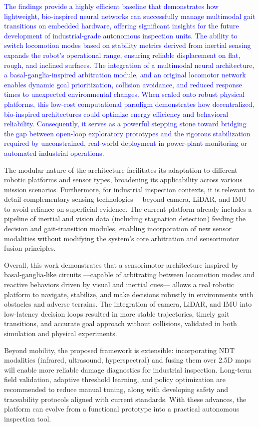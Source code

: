 \documentclass[preprint,12pt]{elsarticle}
\newcommand{\revblue}[1]{\textcolor{blue}{#1}}
\begin{document}
\revblue{The findings provide a highly efficient baseline that demonstrates how lightweight, bio-inspired neural networks can successfully manage multimodal gait transitions on embedded hardware, offering significant insights for the future development of industrial-grade autonomous inspection units. The ability to switch locomotion modes based on stability metrics derived from inertial sensing expands the robot's operational range, ensuring reliable displacement on flat, rough, and inclined surfaces. The integration of a multimodal neural architecture, a basal-ganglia-inspired arbitration module, and an original locomotor network enables dynamic goal prioritization, collision avoidance, and reduced response times to unexpected environmental changes. When scaled onto robust physical platforms, this low-cost computational paradigm demonstrates how decentralized, bio-inspired architectures could optimize energy efficiency and behavioral reliability. Consequently, it serves as a powerful stepping stone toward bridging the gap between open-loop exploratory prototypes and the rigorous stabilization required by unconstrained, real-world deployment in power-plant monitoring or automated industrial operations.} 

The modular nature of the architecture facilitates its adaptation to different robotic platforms and sensor types, broadening its applicability across various mission scenarios. Furthermore, for industrial inspection contexts, it is relevant to detail complementary sensing technologies ---beyond camera, LiDAR, and IMU--- to avoid reliance on superficial evidence. The current platform already includes a pipeline of inertial and vision data (including stagnation detection) feeding the decision and gait-transition modules, enabling incorporation of new sensor modalities without modifying the system’s core arbitration and sensorimotor fusion principles. 

Overall, this work demonstrates that a sensorimotor architecture inspired by basal-ganglia-like circuits ---capable of arbitrating between locomotion modes and reactive behaviors driven by visual and inertial cues--- allows a real robotic platform to navigate, stabilize, and make decisions robustly in environments with obstacles and adverse terrains. The integration of camera, LiDAR, and IMU into low-latency decision loops resulted in more stable trajectories, timely gait transitions, and accurate goal approach without collisions, validated in both simulation and physical experiments. 

Beyond mobility, the proposed framework is extensible: incorporating NDT modalities (infrared, ultrasound, hyperspectral) and fusing them over 2.5D maps will enable more reliable damage diagnostics for industrial inspection. Long-term field validation, adaptive threshold learning, and policy optimization are recommended to reduce manual tuning, along with developing safety and traceability protocols aligned with current standards. With these advances, the platform can evolve from a functional prototype into a practical autonomous inspection tool.
\end{document}
